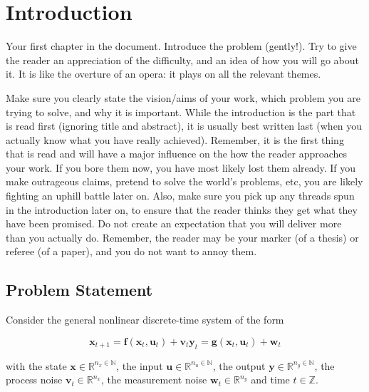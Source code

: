 \chapter{Introduction}
\label{sec:introduction}

Your first chapter in the document.
Introduce the problem (gently!). Try to give the reader an appreciation of the difficulty, and an idea of how you will go about it. It is like the overture of an opera: it plays on all the relevant themes.

Make sure you clearly state the vision/aims of your work, which problem you are trying to solve, and why it is important. While the introduction is the part that is read first (ignoring title and abstract), it is usually best written last (when you actually know what you have really achieved). Remember, it is the first thing that is read and will have a major influence on the how the reader approaches your work. If you bore them now, you have most likely lost them already. If you make outrageous claims, pretend to solve the world's problems, etc, you are likely fighting an uphill battle later on. Also, make sure you pick up any threads spun in the introduction later on, to ensure that the reader thinks they get what they have been promised. Do not create an expectation that you will deliver more than you actually do. Remember, the reader may be your marker (of a thesis) or referee (of a paper), and you do not want to annoy them.

\section{Problem Statement} \label{Problem Statement}

Consider the general nonlinear discrete-time system of the form

\begin{subequations} \label{System equation}
\begin{equation}
\boldsymbol{x}_{t+1} = \boldsymbol{f} \left( \boldsymbol{x}_{t}, \boldsymbol{u}_t \right) + \boldsymbol{v}_{t}
\end{equation}
\begin{equation}
\boldsymbol{y}_{t} = \boldsymbol{g} \left( \boldsymbol{x}_{t}, \boldsymbol{u}_t \right) + \boldsymbol{w}_{t}
\end{equation}
\end{subequations}

with the state $\boldsymbol{x} \in \mathbb{R}^{n_x \in \mathbb{N}}$, the input $\boldsymbol{u} \in \mathbb{R}^{n_u \in \mathbb{N}}$, the output $\boldsymbol{y} \in \mathbb{R}^{n_y \in \mathbb{N}}$, the process noise $\boldsymbol{v}_{t} \in \mathbb{R}^{n_x}$, the measurement noise $\boldsymbol{w}_{t} \in \mathbb{R}^{n_y}$ and time $t \in \mathbb{Z}$. 

